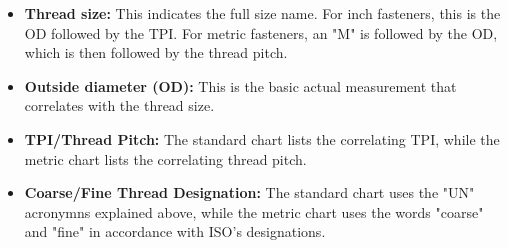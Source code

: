 \documentclass[english,]{article}
\providecommand{\tightlist}{%
  \setlength{\itemsep}{0pt}\setlength{\parskip}{0pt}}
\begin{document}
\begin{itemize}
\tightlist
\item
  \textbf{Thread size:} This indicates the full size name. For inch
  fasteners, this is the OD followed by the TPI. For metric fasteners,
  an "M" is followed by the OD, which is then followed by the thread
  pitch.
\item
  \textbf{Outside diameter (OD):} This is the basic actual measurement
  that correlates with the thread size.
\item
  \textbf{TPI/Thread Pitch:} The standard chart lists the correlating
  TPI, while the metric chart lists the correlating thread pitch.
\item
  \textbf{Coarse/Fine Thread Designation:} The standard chart uses the
  "UN" acronymns explained above, while the metric chart uses the words
  "coarse" and "fine" in accordance with ISO's designations.
\end{itemize}
\end{document}
